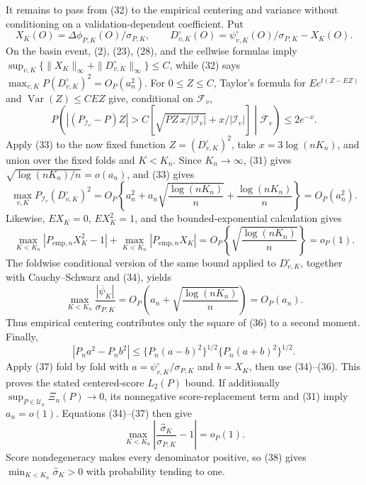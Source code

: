 It remains to pass from (32) to the empirical centering and variance without conditioning on a validation-dependent coefficient.  Put
\[
 X_K(O)=\Delta\phi_{P,K}(O)/\sigma_{P,K},\qquad
 D_{v,K}^{\circ}(O)=\psi_{v,K}^{\circ}(O)/\sigma_{P,K}-X_K(O).
\]
On the basin event, (2), (23), (28), and the cellwise formulas imply
\(\sup_{v,K}\{\|X_K\|_\infty+\|D_{v,K}^{\circ}\|_\infty\}\leq C\), while (32) says \(\max_{v,K}P(D_{v,K}^{\circ})^2=O_P(a_n^2)\).  For \(0\leq Z\leq C\), Taylor's formula for \(E e^{t(Z-EZ)}\) and \(\operatorname{Var}(Z)\leq C EZ\) give, conditional on \(\mathcal F_v\),
\[
 P\!\left(\left|(P_{\mathcal I_v}-P)Z\right|>
 C\left[\sqrt{PZ\,x/|\mathcal I_v|}+x/|\mathcal I_v|\right]\middle|\mathcal F_v\right)
 \leq2e^{-x}.                                                                  \tag{33}
\]
Apply (33) to the now fixed function \(Z=(D_{v,K}^{\circ})^2\), take \(x=3\log(nK_n)\), and union over the fixed folds and \(K<K_n\).  Since \(K_n\to\infty\), (31) gives \(\sqrt{\log(nK_n)/n}=o(a_n)\), and (33) gives
\[
 \max_{v,K}P_{\mathcal I_v}(D_{v,K}^{\circ})^2
 =O_P\!\left\{a_n^2+a_n\sqrt{\frac{\log(nK_n)}n}
 +\frac{\log(nK_n)}n\right\}=O_P(a_n^2).                                      \tag{34}
\]
Likewise, \(EX_K=0\), \(EX_K^2=1\), and the bounded-exponential calculation gives
\[
 \max_{K<K_n}|P_{\mathrm{emp},n}X_K^2-1|
 +\max_{K<K_n}|P_{\mathrm{emp},n}X_K|
 =O_P\!\left\{\sqrt{\frac{\log(nK_n)}n}\right\}=o_P(1).                    \tag{35}
\]
The foldwise conditional version of the same bound applied to \(D_{v,K}^{\circ}\), together with Cauchy--Schwarz and (34), yields
\[
 \max_{K<K_n}\frac{|\overline\psi_K|}{\sigma_{P,K}}
 =O_P\!\left(a_n+\sqrt{\frac{\log(nK_n)}n}\right)=O_P(a_n).                  \tag{36}
\]
Thus empirical centering contributes only the square of (36) to a second moment.  Finally,
\[
 |P_n a^2-P_n b^2|
 \leq\{P_n(a-b)^2\}^{1/2}\{P_n(a+b)^2\}^{1/2}.                                \tag{37}
\]
Apply (37) fold by fold with \(a=\psi_{v,K}^{\circ}/\sigma_{P,K}\) and \(b=X_K\), then use (34)--(36).  This proves the stated centered-score \(L_2(P)\) bound.  If additionally \(\sup_{P\in\mathcal U_n}\Xi_n(P)\to0\), its nonnegative score-replacement term and (31) imply \(a_n=o(1)\).  Equations (34)--(37) then give
\[
 \max_{K<K_n}\left|\frac{\widehat\sigma_K}{\sigma_{P,K}}-1\right|=o_P(1).       \tag{38}
\]
Score nondegeneracy makes every denominator positive, so (38) gives \(\min_{K<K_n}\widehat\sigma_K>0\) with probability tending to one.


